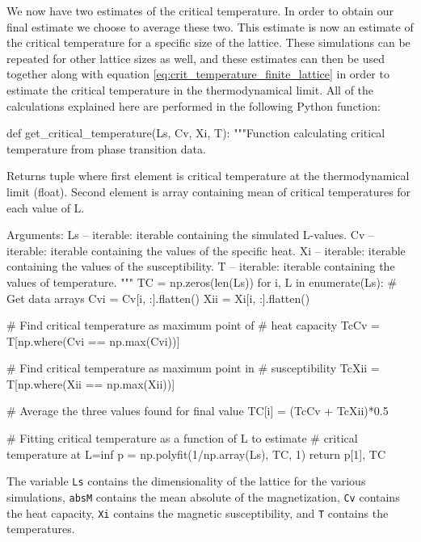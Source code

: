 \documentclass[reprint,english,notitlepage]{revtex4-1}  %
\begin{document}
We now have two estimates of the critical temperature. In order to obtain our final estimate we choose to average these two. This estimate is now an estimate of the critical temperature for a specific size of the lattice. These simulations can be repeated for other lattice sizes as well, and these estimates can then be used together along with equation \eqref{eq:crit_temperature_finite_lattice} in order to estimate the critical temperature in the thermodynamical limit. All of the calculations explained here are performed in the following Python function:

\begin{python}
def get_critical_temperature(Ls, Cv, Xi, T):
    """Function calculating critical temperature from phase
    transition data.

    Returns tuple where first element is critical temperature at
    the thermodynamical limit (float). Second element is array
    containing mean of critical temperatures for each value of L.

    Arguments:
    Ls -- iterable: iterable containing the simulated L-values.
    Cv -- iterable: iterable containing the values of the specific
    				heat.
    Xi -- iterable: iterable containing the values of the
    				susceptibility.
    T -- iterable: iterable containing the values of
    			   temperature.
    """
    TC = np.zeros(len(Ls))
    for i, L in enumerate(Ls):
        # Get data arrays
        Cvi = Cv[i, :].flatten()
        Xii = Xi[i, :].flatten()

        # Find critical temperature as maximum point of
        # heat capacity
        TcCv = T[np.where(Cvi == np.max(Cvi))]

        # Find critical temperature as maximum point in
        # susceptibility
        TcXii = T[np.where(Xii == np.max(Xii))]

        # Average the three values found for final value
        TC[i] = (TcCv + TcXii)*0.5

    # Fitting critical temperature as a function of L to estimate
    # critical temperature at L=inf
    p = np.polyfit(1/np.array(Ls), TC, 1)
    return p[1], TC
\end{python} 

The variable \verb+Ls+ contains the dimensionality of the lattice for the various simulations, \verb+absM+ contains the mean absolute of the magnetization, \verb+Cv+ contains the heat capacity, \verb+Xi+ contains the magnetic susceptibility, and \verb+T+ contains the temperatures. 
\end{document}
